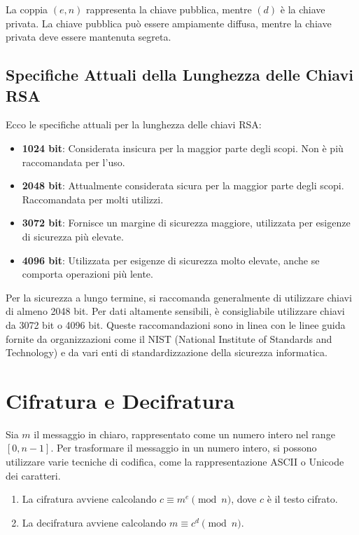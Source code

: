 \documentclass[a4paper,12pt]{report}
\begin{document}
La coppia $(e, n)$ rappresenta la chiave pubblica, mentre $(d)$ è la chiave privata. La chiave pubblica può essere ampiamente diffusa, mentre la chiave privata deve essere mantenuta segreta.

\subsection*{Specifiche Attuali della Lunghezza delle Chiavi RSA}

Ecco le specifiche attuali per la lunghezza delle chiavi RSA:

\begin{itemize}
    \item \textbf{1024 bit}: Considerata insicura per la maggior parte degli scopi. Non è più raccomandata per l'uso.
    \item \textbf{2048 bit}: Attualmente considerata sicura per la maggior parte degli scopi. Raccomandata per molti utilizzi.
    \item \textbf{3072 bit}: Fornisce un margine di sicurezza maggiore, utilizzata per esigenze di sicurezza più elevate.
    \item \textbf{4096 bit}: Utilizzata per esigenze di sicurezza molto elevate, anche se comporta operazioni più lente.
\end{itemize}

Per la sicurezza a lungo termine, si raccomanda generalmente di utilizzare chiavi di almeno 2048 bit. Per dati altamente sensibili, è consigliabile utilizzare chiavi da 3072 bit o 4096 bit. Queste raccomandazioni sono in linea con le linee guida fornite da organizzazioni come il NIST (National Institute of Standards and Technology) e da vari enti di standardizzazione della sicurezza informatica.
\cite{nist}

\section{Cifratura e Decifratura}
Sia $m$ il messaggio in chiaro, rappresentato come un numero intero nel range $[0, n - 1]$. Per trasformare il messaggio in un numero intero, si possono utilizzare varie tecniche di codifica, come la rappresentazione ASCII o Unicode dei caratteri.

\begin{enumerate}
    \item La cifratura avviene calcolando $c \equiv m^e \pmod{n}$, dove $c$ è il testo cifrato.
    \item La decifratura avviene calcolando $m \equiv c^d \pmod{n}$.
\end{enumerate}
\end{document}
